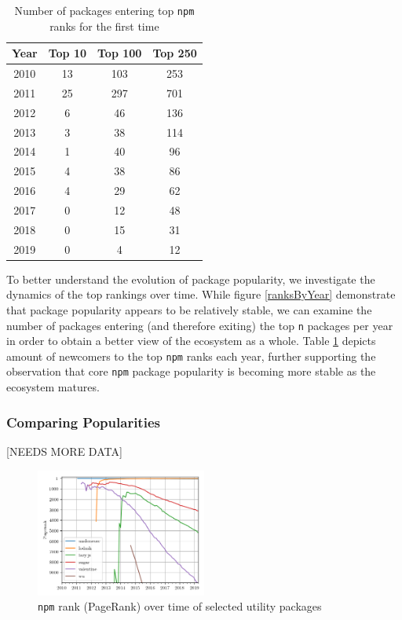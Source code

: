 \documentclass[10pt,conference]{IEEEtran}
\def\code#1{\texttt{#1}}
\begin{document}
\begin{table}
  \centering
  \begin{tabular}{c|c|c|c}
    Year & Top 10 & Top 100 & Top 250 \\
    \hline
    2010 & 13 & 103 & 253\\
    2011 & 25 & 297 & 701\\
    2012 & 6 & 46 & 136\\
    2013 & 3 & 38 & 114\\
    2014 & 1 & 40 & 96\\
    2015 & 4 & 38 & 86\\
    2016 & 4 & 29 & 62\\
    2017 & 0 & 12 & 48\\
    2018 & 0 & 15 & 31\\
    2019 & 0 & 4 & 12\\
  \end{tabular}
  \caption{Number of packages entering top \code{npm} ranks for the first time}
  \label{numEnteringTop}
\end{table}

To better understand the evolution of package popularity,
we investigate the dynamics of the top rankings over time.
While figure \ref{ranksByYear} demonstrate that package popularity
appears to be relatively stable, we can examine the number of packages
entering (and therefore exiting) the top \code{n} packages per year in
order to obtain a better view of the ecosystem as a whole.
Table \ref{numEnteringTop} depicts amount of newcomers to the top
\code{npm} ranks each year, further supporting the observation that
core \code{npm} package popularity is becoming more stable as the 
ecosystem matures.






\subsubsection{Comparing Popularities}
[NEEDS MORE DATA]

\begin{figure}
  \includegraphics[width=0.5\textwidth]{figures/select_packages.png}
  \caption{\code{npm} rank (PageRank) over time of selected utility packages}
  \label{selectPackages}
\end{figure}
\end{document}
